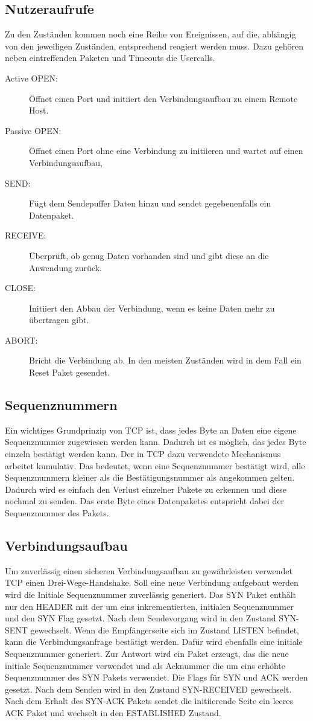 \subsection{Nutzeraufrufe}
Zu den Zuständen kommen noch eine Reihe von Ereignissen, auf die, abhängig von den jeweiligen Zuständen, entsprechend reagiert werden muss. 
Dazu gehören neben eintreffenden Paketen und Timeouts die Usercalls.
\begin{description}
\item[Active OPEN: ]Öffnet einen Port und initiiert den Verbindungsaufbau zu einem Remote Host.
\item[Passive OPEN: ] Öffnet einen Port ohne eine Verbindung zu initiieren und wartet auf einen Verbindungsaufbau,
\item[SEND: ] Fügt dem Sendepuffer Daten hinzu und sendet gegebenenfalls ein Datenpaket.
\item[RECEIVE: ] Überprüft, ob genug Daten vorhanden sind und gibt diese an die Anwendung zurück.
\item[CLOSE: ] Initiiert den Abbau der Verbindung, wenn es keine Daten mehr zu  übertragen gibt.
\item[ABORT: ] Bricht die Verbindung ab. In den meisten Zuständen wird in dem Fall ein Reset Paket gesendet.
\end{description}
\subsection{Sequenznummern}
Ein wichtiges Grundprinzip von TCP ist, dass jedes Byte an Daten eine eigene Sequenznummer zugewiesen werden kann. Dadurch ist es möglich, das jedes Byte einzeln bestätigt werden kann. Der in TCP dazu verwendete Mechanismus arbeitet kumulativ. Das bedeutet, wenn eine Sequenznummer bestätigt wird, alle Sequenznummern kleiner als die Bestätigungsnummer als angekommen gelten. Dadurch wird es einfach den Verlust einzelner Pakete zu erkennen und diese nochmal zu senden. Das erste Byte eines Datenpaketes entspricht dabei der Sequenznummer des Pakets. 

\subsection{Verbindungsaufbau}
Um zuverlässig einen sicheren Verbindungsaufbau zu gewährleisten verwendet TCP einen Drei-Wege-Handshake. Soll eine neue Verbindung aufgebaut werden wird die Initiale Sequenznummer zuverlässig generiert. Das SYN Paket enthält nur den HEADER mit der um eins inkrementierten, initialen Sequenznummer und den SYN Flag gesetzt. Nach dem Sendevorgang wird in den Zustand SYN-SENT gewechselt. Wenn die Empfängerseite sich im Zustand LISTEN befindet, kann die Verbindungsanfrage bestätigt werden. Dafür wird ebenfalls eine initiale Sequenznummer generiert. Zur Antwort wird ein Paket erzeugt, das die neue initiale Sequenznummer verwendet und als Acknummer die um eins erhöhte Sequenznummer des SYN Pakets verwendet. Die Flags für SYN und ACK werden gesetzt. Nach dem Senden wird in den Zustand SYN-RECEIVED gewechselt.\\
Nach dem Erhalt des SYN-ACK Pakets sendet die initiierende Seite ein leeres ACK Paket und wechselt in den ESTABLISHED Zustand. 

